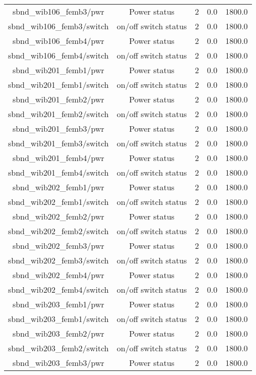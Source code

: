 \begin{table}[ptb]
\begin{tabular}{c | c c c c}
sbnd_wib106_femb3/pwr & Power status & 2 & 0.0 & 1800.0\\ 
sbnd_wib106_femb3/switch & on/off switch status & 2 & 0.0 & 1800.0\\ 
sbnd_wib106_femb4/pwr & Power status & 2 & 0.0 & 1800.0\\ 
sbnd_wib106_femb4/switch & on/off switch status & 2 & 0.0 & 1800.0\\ 
sbnd_wib201_femb1/pwr & Power status & 2 & 0.0 & 1800.0\\ 
sbnd_wib201_femb1/switch & on/off switch status & 2 & 0.0 & 1800.0\\ 
sbnd_wib201_femb2/pwr & Power status & 2 & 0.0 & 1800.0\\ 
sbnd_wib201_femb2/switch & on/off switch status & 2 & 0.0 & 1800.0\\ 
sbnd_wib201_femb3/pwr & Power status & 2 & 0.0 & 1800.0\\ 
sbnd_wib201_femb3/switch & on/off switch status & 2 & 0.0 & 1800.0\\ 
sbnd_wib201_femb4/pwr & Power status & 2 & 0.0 & 1800.0\\ 
sbnd_wib201_femb4/switch & on/off switch status & 2 & 0.0 & 1800.0\\ 
sbnd_wib202_femb1/pwr & Power status & 2 & 0.0 & 1800.0\\ 
sbnd_wib202_femb1/switch & on/off switch status & 2 & 0.0 & 1800.0\\ 
sbnd_wib202_femb2/pwr & Power status & 2 & 0.0 & 1800.0\\ 
sbnd_wib202_femb2/switch & on/off switch status & 2 & 0.0 & 1800.0\\ 
sbnd_wib202_femb3/pwr & Power status & 2 & 0.0 & 1800.0\\ 
sbnd_wib202_femb3/switch & on/off switch status & 2 & 0.0 & 1800.0\\ 
sbnd_wib202_femb4/pwr & Power status & 2 & 0.0 & 1800.0\\ 
sbnd_wib202_femb4/switch & on/off switch status & 2 & 0.0 & 1800.0\\ 
sbnd_wib203_femb1/pwr & Power status & 2 & 0.0 & 1800.0\\ 
sbnd_wib203_femb1/switch & on/off switch status & 2 & 0.0 & 1800.0\\ 
sbnd_wib203_femb2/pwr & Power status & 2 & 0.0 & 1800.0\\ 
sbnd_wib203_femb2/switch & on/off switch status & 2 & 0.0 & 1800.0\\ 
sbnd_wib203_femb3/pwr & Power status & 2 & 0.0 & 1800.0\\ 

\end{tabular}
\end{table}
